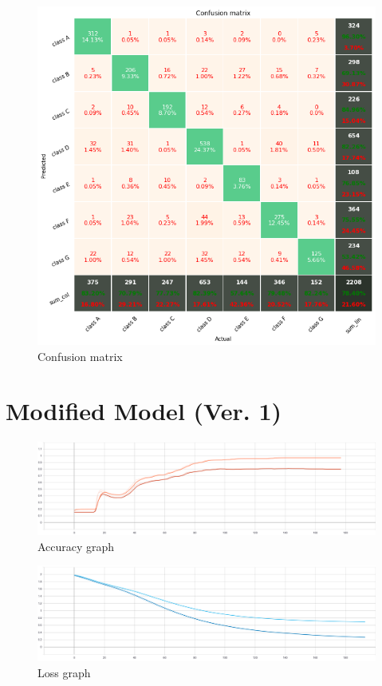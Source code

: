 \begin{figure}[htbp]
\centering
\includegraphics[width=0.6\linewidth]{evaluation/fig/confusion0.png}
\caption{Confusion matrix}
\label{fig:confusion0}
\end{figure}

\newpage
\section{Modified Model (Ver. 1)}

\begin{figure}[htbp]
\centering
\includegraphics[width=0.7\linewidth]{evaluation/fig/Accuracy1.png}
\caption{Accuracy graph}
\label{fig:accuracy1}
\end{figure}

\begin{figure}[htbp]
\centering
\includegraphics[width=0.7\linewidth]{evaluation/fig/Loss1.png}
\caption{Loss graph}
\label{fig:evaluation1}
\end{figure}

